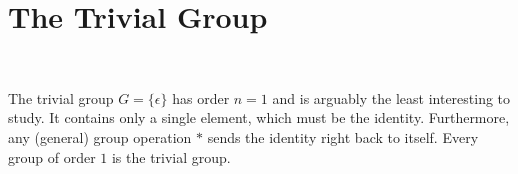 \section{The Trivial Group}~\label{sec:trivial}

The trivial group $G = \{ \epsilon \}$ has order $n = 1$
and is arguably the least interesting to study.
It contains only a single element, which must be the identity.
Furthermore, any (general) group operation $*$ 
sends the identity right back to itself.
Every group of order $1$ is the trivial group.
